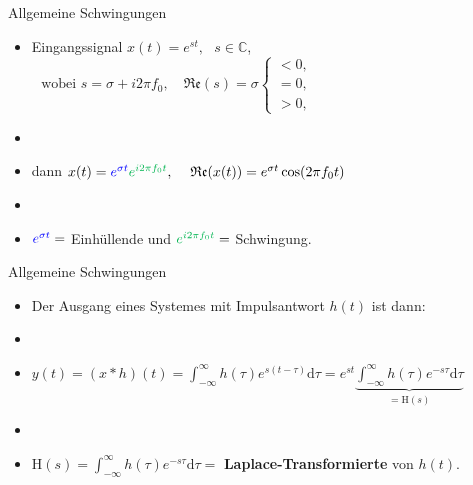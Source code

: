 \documentclass[14pt, aspectratio=169, handout]{beamer}
\begin{document}
\begin{frame}{Allgemeine Schwingungen}
    \begin{itemize}
        \item Eingangssignal $x(t) = \displaystyle e^{st}, \hspace{8pt} s \in \mathbb{C}$,
$ \hspace{8pt} \text{wobei }s = \sigma + i 2 \pi f_0, \hspace{12pt} \mathfrak{Re}(s) = \sigma \begin{cases}
    < 0, \\
    = 0, \\
    > 0,
\end{cases}$
    \item[] 
    \item[] dann $x(t) = \textcolor{myblue}{e^{\sigma t}}\textcolor{mygreen}{e^{i 2 \pi f_0 t}}, \hspace{12pt} \mathfrak{Re}(x(t)) = e^{\sigma t}\cos (2\pi f_0 t)$
    \item[] 
    \item $\textcolor{myblue}{e^{\sigma t}} =$ \textcolor{myblue}{Einhüllende} und $\textcolor{mygreen}{e^{i 2 \pi f_0 t}} =$ \textcolor{mygreen}{Schwingung}.
    \end{itemize}
\end{frame}

\begin{frame}{Allgemeine Schwingungen}
    \begin{itemize}
        \item Der Ausgang eines Systemes mit Impulsantwort $h(t)$ ist dann:
        \item[] 
        \item[] $y(t) = (x \ast h)(t) = \displaystyle\int_{-\infty}^{\infty} h(\tau)e^{s(t-\tau)} \text{d}\tau = e^{st} \underbrace{\int_{-\infty}^{\infty} h(\tau) e^{-s\tau} \text{d}\tau}_{=\text{H}(s)}$
        \item[] 
        \item[] $\text{H}(s) = \displaystyle\int_{-\infty}^{\infty} h(\tau) e^{-s\tau} \text{d}\tau=$ \textbf{Laplace-Transformierte} von $h(t)$.
    \end{itemize}
\end{frame}
\end{document}
